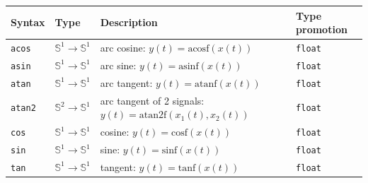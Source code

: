 \bigskip

\begin{tabular}{|l|l|l|l|}


\hline
\textbf{Syntax} & \textbf{Type}  & \textbf{Description} & \textbf{Type promotion} \\
\hline

\texttt{acos} & $\mathbb{S}^{1}\rightarrow\mathbb{S}^{1}$ & arc cosine: $y(t)=\mathrm{acosf}(x(t))$  & \texttt{float} \\
\texttt{asin} & $\mathbb{S}^{1}\rightarrow\mathbb{S}^{1}$ & arc sine: $y(t)=\mathrm{asinf}(x(t))$  & \texttt{float} \\
\texttt{atan} & $\mathbb{S}^{1}\rightarrow\mathbb{S}^{1}$ & arc tangent: $y(t)=\mathrm{atanf}(x(t))$ & \texttt{float} \\
\texttt{atan2} & $\mathbb{S}^{2}\rightarrow\mathbb{S}^{1}$ & arc tangent of 2 signals: $y(t)=\mathrm{atan2f}(x_{1}(t), x_{2}(t))$  & \texttt{float}\\

\texttt{cos} & $\mathbb{S}^{1}\rightarrow\mathbb{S}^{1}$ & cosine: $y(t)=\mathrm{cosf}(x(t))$ & \texttt{float} \\
\texttt{sin} & $\mathbb{S}^{1}\rightarrow\mathbb{S}^{1}$ & sine: $y(t)=\mathrm{sinf}(x(t))$  & \texttt{float}\\
\texttt{tan} & $\mathbb{S}^{1}\rightarrow\mathbb{S}^{1}$ & tangent: $y(t)=\mathrm{tanf}(x(t))$  & \texttt{float}\\


\end{tabular}
